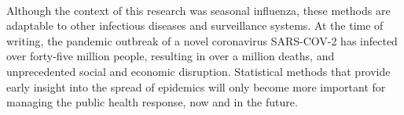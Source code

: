 \\ Although the context of this research was seasonal influenza, these methods are adaptable to other infectious diseases and surveillance systems. At the time of writing, the pandemic outbreak of a novel coronavirus SARS-COV-2 has infected over forty-five million people, resulting in over a million deaths, and unprecedented social and economic disruption. Statistical methods that provide early insight into the spread of epidemics will only become more important for managing the public health response, now and in the future.